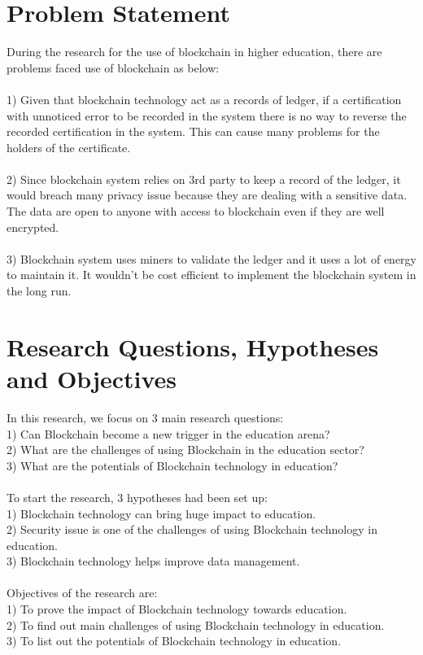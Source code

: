\documentclass[a4paper, 12pt]{article}
\begin{document}
\section{Problem Statement}
During the research for the use of blockchain in higher education, there are problems faced use of blockchain as below:\\
\\1) Given that blockchain technology act as a records of ledger, if a certification with unnoticed error to be recorded in the system there is no way to reverse the recorded certification in the system. This can cause many problems for the holders of the certificate.\\
\\2) Since blockchain system relies on 3rd party to keep a record of the ledger, it would breach many privacy issue because they are dealing with a sensitive data. The data are open to anyone with access to blockchain even if they are well encrypted.\\
\\3) Blockchain system uses miners to validate the ledger and it uses a lot of energy to maintain it. It wouldn't be cost efficient to implement the blockchain system in the long run.

\section{Research Questions, Hypotheses and Objectives}
In this research, we focus on 3 main research questions:\\
1) Can Blockchain become a new trigger in the education arena?\\
2) What are the challenges of using Blockchain in the education sector?\\
3) What are the potentials of Blockchain technology in education?\\
\\To start the research, 3 hypotheses had been set up:\\
1) Blockchain technology can bring huge impact to education.\\
2) Security issue is one of the challenges of using Blockchain technology in education.\\
3) Blockchain technology helps improve data management.\\
\\Objectives of the research are:\\
1) To prove the impact of Blockchain technology towards education.\\
2) To find out main challenges of using Blockchain technology in education.\\
3) To list out the potentials of Blockchain technology in education.\\
\end{document}
